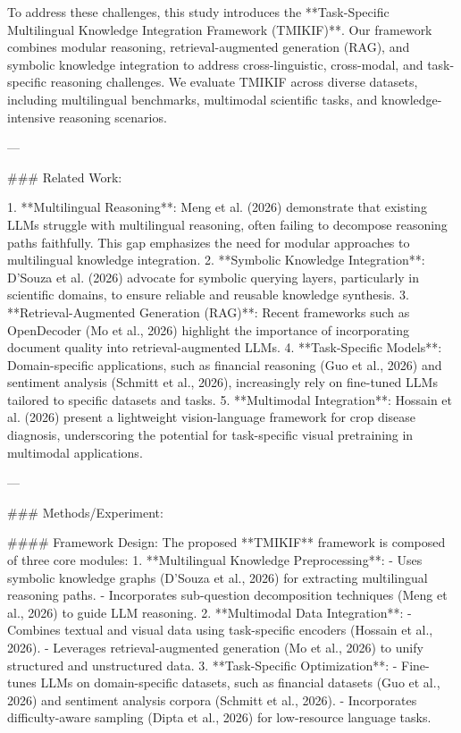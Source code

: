 To address these challenges, this study introduces the **Task-Specific Multilingual Knowledge Integration Framework (TMIKIF)**. Our framework combines modular reasoning, retrieval-augmented generation (RAG), and symbolic knowledge integration to address cross-linguistic, cross-modal, and task-specific reasoning challenges. We evaluate TMIKIF across diverse datasets, including multilingual benchmarks, multimodal scientific tasks, and knowledge-intensive reasoning scenarios.

---

### Related Work:

1. **Multilingual Reasoning**: Meng et al. (2026) demonstrate that existing LLMs struggle with multilingual reasoning, often failing to decompose reasoning paths faithfully. This gap emphasizes the need for modular approaches to multilingual knowledge integration.
2. **Symbolic Knowledge Integration**: D'Souza et al. (2026) advocate for symbolic querying layers, particularly in scientific domains, to ensure reliable and reusable knowledge synthesis.
3. **Retrieval-Augmented Generation (RAG)**: Recent frameworks such as OpenDecoder (Mo et al., 2026) highlight the importance of incorporating document quality into retrieval-augmented LLMs.
4. **Task-Specific Models**: Domain-specific applications, such as financial reasoning (Guo et al., 2026) and sentiment analysis (Schmitt et al., 2026), increasingly rely on fine-tuned LLMs tailored to specific datasets and tasks.
5. **Multimodal Integration**: Hossain et al. (2026) present a lightweight vision-language framework for crop disease diagnosis, underscoring the potential for task-specific visual pretraining in multimodal applications.

---

### Methods/Experiment:

#### Framework Design:
The proposed **TMIKIF** framework is composed of three core modules:
1. **Multilingual Knowledge Preprocessing**:
   - Uses symbolic knowledge graphs (D'Souza et al., 2026) for extracting multilingual reasoning paths.
   - Incorporates sub-question decomposition techniques (Meng et al., 2026) to guide LLM reasoning.
2. **Multimodal Data Integration**:
   - Combines textual and visual data using task-specific encoders (Hossain et al., 2026).
   - Leverages retrieval-augmented generation (Mo et al., 2026) to unify structured and unstructured data.
3. **Task-Specific Optimization**:
   - Fine-tunes LLMs on domain-specific datasets, such as financial datasets (Guo et al., 2026) and sentiment analysis corpora (Schmitt et al., 2026).
   - Incorporates difficulty-aware sampling (Dipta et al., 2026) for low-resource language tasks.

